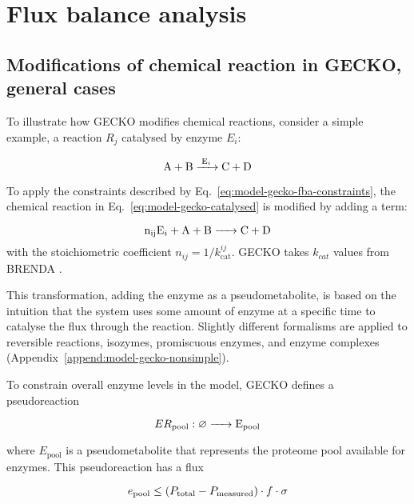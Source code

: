 \chapter{Flux balance analysis}
\label{append:model}

\section{Modifications of chemical reaction in GECKO, general cases}
\label{append:model-gecko}

To illustrate how GECKO modifies chemical reactions, consider a simple example, a reaction $R_{j}$ catalysed by enzyme $E_{i}$:

\begin{equation}
  \ce{ A + B ->[E_{i}] C + D }
  \label{eq:model-gecko-catalysed}
\end{equation}

To apply the constraints described by Eq.\ \ref{eq:model-gecko-fba-constraints}, the chemical reaction in Eq.\ \ref{eq:model-gecko-catalysed} is modified by adding a term:

\begin{equation}
  \ce{ n_{ij}E_{i} + A + B -> C + D }
  \label{eq:model-gecko-catalysed-formalism}
\end{equation}
with the stoichiometric coefficient $n_{ij} = 1/k_{\mathrm{cat}}^{ij}$.
GECKO takes $k_{cat}$ values from BRENDA \parencite{changBRENDAELIXIRCore2021}.

This transformation, adding the enzyme as a pseudometabolite, is based on the intuition that the system uses some amount of enzyme at a specific time to catalyse the flux through the reaction.
Slightly different formalisms are applied to reversible reactions, isozymes, promiscuous enzymes, and enzyme complexes (Appendix~\ref{append:model-gecko-nonsimple}).

To constrain overall enzyme levels in the model, GECKO defines a pseudoreaction

\begin{equation}
  ER_{\mathrm{pool}}: \varnothing \ce{ -> E_{pool} }
  \label{eq:model-gecko-enzyme-pool}
\end{equation}

where $E_{\mathrm{pool}}$ is a pseudometabolite that represents the proteome pool available for enzymes.
This pseudoreaction has a flux

\begin{equation}
  e_{\mathrm{pool}} \leq (P_{\mathrm{total}} - P_{\mathrm{measured}}) \cdot f \cdot \sigma
  \label{eq:model-gecko-enzyme-pool-flux}
\end{equation}

